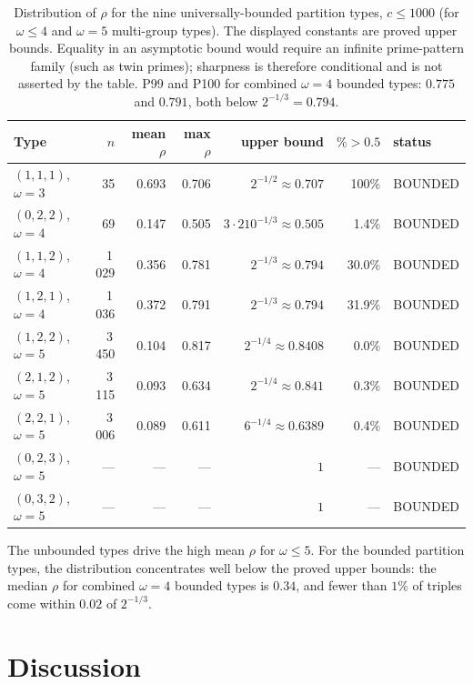 \documentclass[12pt]{article}
\theoremstyle{definition}
\begin{document}
\begin{table}[h]
\centering
\small\begin{tabular}{lrrrrrl}
\hline
Type & $n$ & mean $\rho$ & max $\rho$ & upper bound & $\%\!>\!0.5$ & status \\
\hline
$(1,1,1)$, $\omega=3$ & 35     & 0.693 & 0.706 & $2^{-1/2}{\approx}0.707$ & 100\% & BOUNDED \\
$(0,2,2)$, $\omega=4$ & 69     & 0.147 & 0.505 & $3{\cdot}210^{-1/3}{\approx}0.505$  & 1.4\% & BOUNDED \\
$(1,1,2)$, $\omega=4$ & 1\,029 & 0.356 & 0.781 & $2^{-1/3}{\approx}0.794$  & 30.0\% & BOUNDED \\
$(1,2,1)$, $\omega=4$ & 1\,036 & 0.372 & 0.791 & $2^{-1/3}{\approx}0.794$  & 31.9\% & BOUNDED \\
$(1,2,2)$, $\omega=5$ & 3\,450 & 0.104 & 0.817 & $2^{-1/4}{\approx}0.8408$ & 0.0\% & BOUNDED \\
$(2,1,2)$, $\omega=5$ & 3\,115 & 0.093 & 0.634 & $2^{-1/4}{\approx}0.841$ & 0.3\% & BOUNDED \\
$(2,2,1)$, $\omega=5$ & 3\,006 & 0.089 & 0.611 & $6^{-1/4}{\approx}0.6389$ & 0.4\% & BOUNDED \\
$(0,2,3)$, $\omega=5$ & --- & --- & --- & $1$ & --- & BOUNDED \\
$(0,3,2)$, $\omega=5$ & --- & --- & --- & $1$ & --- & BOUNDED \\
\hline
\end{tabular}
\caption{Distribution of $\rho$ for the nine universally-bounded partition types,
  $c \le 1000$ (for $\omega \le 4$ and $\omega=5$ multi-group types).
  The displayed constants are proved upper bounds.  Equality in an asymptotic
  bound would require an infinite prime-pattern family (such as twin primes);
  sharpness is therefore conditional and is not asserted by the table.
  P99 and P100 for combined $\omega=4$ bounded types: $0.775$ and $0.791$, both below
  $2^{-1/3} = 0.794$.}
\label{tab:bounded}
\end{table}

The unbounded types drive the high mean $\rho$ for $\omega \le 5$.
For the bounded partition types, the distribution concentrates well below the proved
upper bounds: the median $\rho$ for combined $\omega=4$ bounded types is $0.34$, and
fewer than $1\%$ of triples come within $0.02$ of $2^{-1/3}$.

\section{Discussion}
\end{document}
